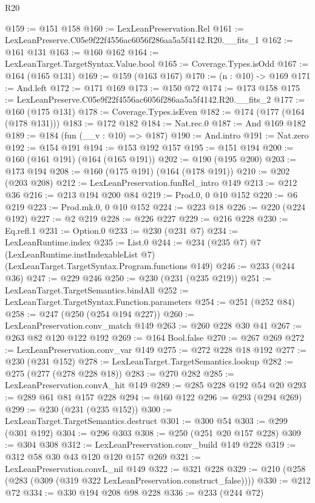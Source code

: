 \begin{lexlean}{R20}
\begin{coremodule}
@159 := @151 @158
@160 := LexLeanPreservation.Rel
@161 := LexLeanPreserve.C05e9f22f4556ac6056f286aa5a5f4142.R20.__fits_1
@162 := @161 @131
@163 := @160 @162
@164 := LexLeanTarget.TargetSyntax.Value.bool
@165 := Coverage.Types.isOdd
@167 := @164 (@165 @131)
@169 := @159 (@163 @167)
@170 := (n : @10) -> @169
@171 := And.left
@172 := @171 @169
@173 := @150 @72
@174 := @173 @158
@175 := LexLeanPreserve.C05e9f22f4556ac6056f286aa5a5f4142.R20.__fits_2
@177 := @160 (@175 @131)
@178 := Coverage.Types.isEven
@182 := @174 (@177 (@164 (@178 @131)))
@183 := @172 @182
@184 := Nat.rec.{0}
@187 := And @169 @182
@189 := @184 (fun (__v : @10) => @187)
@190 := And.intro
@191 := Nat.zero
@192 := @154 @191
@194 := @153 @192 @157
@195 := @151 @194
@200 := @160 (@161 @191) (@164 (@165 @191))
@202 := @190 (@195 @200)
@203 := @173 @194
@208 := @160 (@175 @191) (@164 (@178 @191))
@210 := @202 (@203 @208)
@212 := LexLeanPreservation.funRel_intro @149
@213 := @212 @36
@216 := @213 @194 @200 @84
@219 := Prod.{0, 0} @10 @152
@220 := @6 @219
@223 := Prod.mk.{0, 0} @10 @152
@224 := @223 @18
@226 := @220 (@224 @192)
@227 := @2 @219
@228 := @226 @227
@229 := @216 @228
@230 := Eq.refl.{1}
@231 := Option.{0}
@233 := @230 (@231 @7)
@234 := LexLeanRuntime.index
@235 := List.{0}
@244 := @234
    (@235 @7)
    @7
    (LexLeanRuntime.instIndexableList @7)
    (LexLeanTarget.TargetSyntax.Program.functions @149)
@246 := @233 (@244 @36)
@247 := @229 @246
@250 := @230 (@231 (@235 @219))
@251 := LexLeanTarget.TargetSemantics.bindAll
@252 := LexLeanTarget.TargetSyntax.Function.parameters
@254 := @251 (@252 @84)
@258 := @247 (@250 (@254 @194 @227))
@260 := LexLeanPreservation.conv_match @149
@263 := @260 @228 @30 @41
@267 := @263 @82 @120 @122 @192
@269 := @164 Bool.false
@270 := @267 @269
@272 := LexLeanPreservation.conv_var @149
@275 := @272 @228 @18 @192
@277 := @230 (@231 @152)
@278 := LexLeanTarget.TargetSemantics.lookup
@282 := @275 (@277 (@278 @228 @18))
@283 := @270 @282
@285 := LexLeanPreservation.convA_hit @149
@289 := @285 @228 @192 @54 @20
@293 := @289 @61 @81 @157 @228
@294 := @160 @122
@296 := @293 (@294 @269)
@299 := @230 (@231 (@235 @152))
@300 := LexLeanTarget.TargetSemantics.destruct
@301 := @300 @54
@303 := @299 (@301 @192)
@304 := @296 @303
@308 := @250 (@251 @20 @157 @228)
@309 := @304 @308
@312 := LexLeanPreservation.conv_build @149 @228
@319 := @312 @58 @30 @43 @120 @120 @157 @269
@321 := LexLeanPreservation.convL_nil @149
@322 := @321 @228
@329 := @210 (@258 (@283 (@309 (@319 @322 LexLeanPreservation.construct_false))))
@330 := @212 @72
@334 := @330 @194 @208 @98 @228
@336 := @233 (@244 @72)

\end{coremodule}
\end{lexlean}
